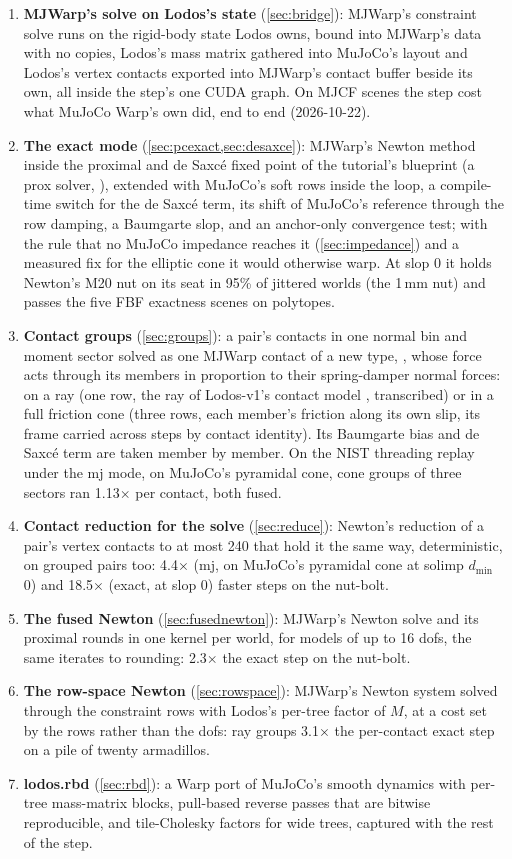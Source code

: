 \begin{enumerate}
\item \textbf{MJWarp's solve on Lodos's state} (\cref{sec:bridge}): MJWarp's constraint solve runs on the rigid-body state Lodos owns, bound into MJWarp's data with no copies, Lodos's mass matrix gathered into MuJoCo's layout and Lodos's vertex contacts exported into MJWarp's contact buffer beside its own, all inside the step's one CUDA graph. On MJCF scenes the step cost what MuJoCo Warp's own did, end to end (2026-10-22).
\item \textbf{The exact mode} (\cref{sec:pcexact,sec:desaxce}): MJWarp's Newton method inside the proximal and de Saxc\'e fixed point of the tutorial's blueprint (a prox solver, ), extended with MuJoCo's soft rows inside the loop, a compile-time switch for the de Saxc\'e term, its shift of MuJoCo's reference through the row damping, a Baumgarte slop, and an anchor-only convergence test; with the rule that no MuJoCo impedance reaches it (\cref{sec:impedance}) and a measured fix for the elliptic cone it would otherwise warp. At slop 0 it holds Newton's M20 nut on its seat in 95\% of jittered worlds (the 1\,mm nut) and passes the five FBF exactness scenes on polytopes.
\item \textbf{Contact groups} (\cref{sec:groups}): a pair's contacts in one normal bin and moment sector solved as one MJWarp contact of a new type, , whose force acts through its members in proportion to their spring-damper normal forces: on a ray (one row, the ray of Lodos-v1's contact model \cite{lodosv1}, transcribed) or in a full friction cone (three rows, each member's friction along its own slip, its frame carried across steps by contact identity). Its Baumgarte bias and de Saxc\'e term are taken member by member. On the NIST threading replay under the mj mode, on MuJoCo's pyramidal cone, cone groups of three sectors ran 1.13$\times$ per contact, both fused.
\item \textbf{Contact reduction for the solve} (\cref{sec:reduce}): Newton's reduction \cite{newton} of a pair's vertex contacts to at most 240 that hold it the same way, deterministic, on grouped pairs too: 4.4$\times$ (mj, on MuJoCo's pyramidal cone at solimp $d_{\min}$ 0) and 18.5$\times$ (exact, at slop 0) faster steps on the nut-bolt.
\item \textbf{The fused Newton} (\cref{sec:fusednewton}): MJWarp's Newton solve and its proximal rounds in one kernel per world, for models of up to 16 dofs, the same iterates to rounding: 2.3$\times$ the exact step on the nut-bolt.
\item \textbf{The row-space Newton} (\cref{sec:rowspace}): MJWarp's Newton system solved through the constraint rows with Lodos's per-tree factor of $M$, at a cost set by the rows rather than the dofs: ray groups 3.1$\times$ the per-contact exact step on a pile of twenty armadillos.
\item \textbf{lodos.rbd} (\cref{sec:rbd}): a Warp port of MuJoCo's smooth dynamics with per-tree mass-matrix blocks, pull-based reverse passes that are bitwise reproducible, and tile-Cholesky factors for wide trees, captured with the rest of the step.
\end{enumerate}

